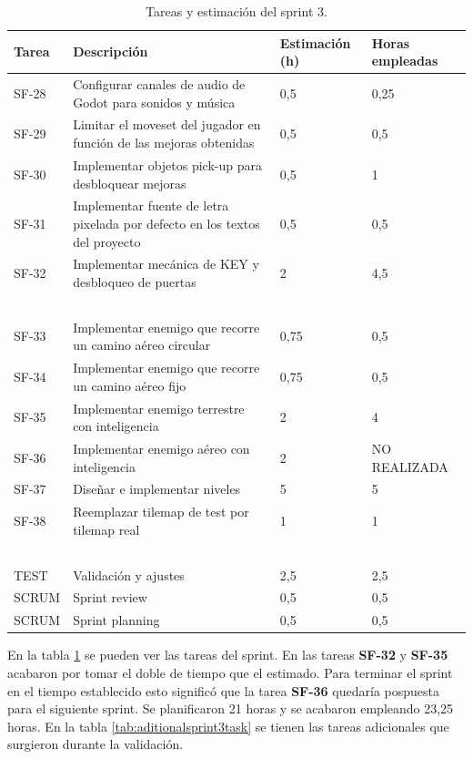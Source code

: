 \begin{table}[!ht]
    \centering
    \begin{tabular}{|l|p{8cm}|p{2cm}|p{2cm}|}
    \hline
        Tarea & Descripción & Estimación (h) & Horas empleadas \\ \hline
        SF-28 & Configurar canales de audio de Godot para sonidos y música & 0,5 & 0,25 \\ \hline
        SF-29 & Limitar el moveset del jugador en función de las mejoras obtenidas & 0,5 & 0,5 \\ \hline
        SF-30 & Implementar objetos pick-up para desbloquear mejoras & 0,5 & 1 \\ \hline
        SF-31 & Implementar fuente de letra pixelada por defecto en los textos del proyecto & 0,5 & 0,5 \\ \hline
        SF-32 & Implementar mecánica de KEY y desbloqueo de puertas & 2 & 4,5 \\ \hline
        ~ & ~ & ~ & ~ \\ \hline
        SF-33 & Implementar enemigo que recorre un camino aéreo circular & 0,75 & 0,5 \\ \hline
        SF-34 & Implementar enemigo que recorre un camino aéreo fijo & 0,75 & 0,5 \\ \hline
        SF-35 & Implementar enemigo terrestre con inteligencia & 2 & 4 \\ \hline
        SF-36 & Implementar enemigo aéreo con inteligencia & 2 & NO REALIZADA \\ \hline
        SF-37 & Diseñar e implementar niveles & 5 & 5 \\ \hline
        SF-38 & Reemplazar tilemap de test por tilemap real & 1 & 1 \\ \hline
        ~ & ~ & ~ & ~ \\ \hline
        TEST & Validación y ajustes & 2,5 & 2,5 \\ \hline
        SCRUM & Sprint review & 0,5 & 0,5 \\ \hline
        SCRUM & Sprint planning & 0,5 & 0,5 \\ \hline
    \end{tabular}
    \caption{Tareas y estimación del sprint 3.}
    \label{tab:sprint3task}
\end{table}

En la tabla \ref{tab:sprint3task} se pueden ver las tareas del sprint. En las tareas \textbf{SF-32} y \textbf{SF-35} acabaron por tomar el doble de tiempo que el estimado. Para terminar el sprint en el tiempo establecido esto significó que la tarea \textbf{SF-36} quedaría pospuesta para el siguiente sprint. Se planificaron 21 horas y se acabaron empleando 23,25 horas. En la tabla \ref{tab:aditionalsprint3task} se tienen las tareas adicionales que surgieron durante la validación.

